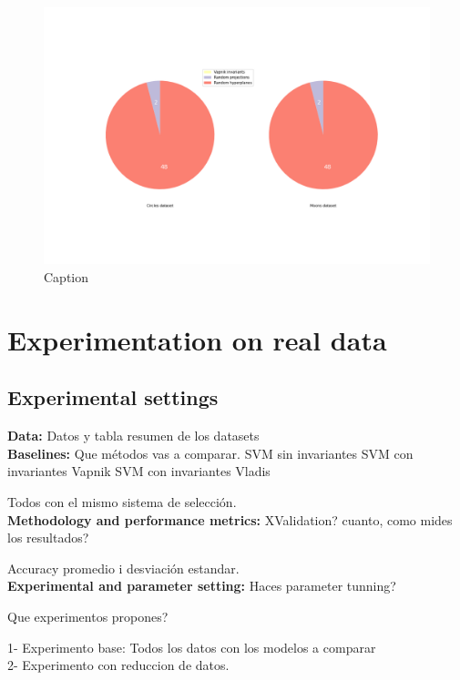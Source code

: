 \begin{figure}
    \centering
    \includegraphics[width=\textwidth]{thesis/Figures/mean_num_selected.png}
    \caption{Caption}
    \label{fig:toys_mean_num_selected}
\end{figure}



\section{Experimentation on real data}
\subsection{Experimental settings}
{\bf Data:} Datos y tabla resumen de los datasets\\
{\bf Baselines:} Que métodos vas a comparar.
SVM sin invariantes
SVM con invariantes Vapnik
SVM con invariantes Vladis

Todos con el mismo sistema de selección.
\\
{\bf Methodology and performance metrics:} XValidation? cuanto, como mides los resultados?

Accuracy promedio i desviación estandar.
\\
{\bf Experimental and parameter setting:}
Haces parameter tunning?

Que experimentos propones?

1- Experimento base: Todos los datos con los modelos a comparar\\
2- Experimento con reduccion de datos.

